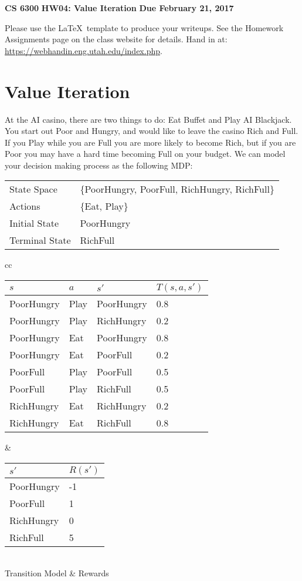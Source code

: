 \documentclass[12pt]{article}
\begin{document}
\begin{center}
{\bf CS 6300} \hfill {\large\bf HW04: Value Iteration} \hfill {\bf Due February 21, 2017}
\end{center}

\noindent
Please use the \LaTeX\ template to produce your writeups. See the
Homework Assignments page on the class website for details.  Hand in
at: \url{https://webhandin.eng.utah.edu/index.php}.

\section{Value Iteration}

At the AI casino, there are two things to do: Eat Buffet and Play AI
Blackjack.  You start out Poor and Hungry, and would like to leave the
casino Rich and Full.  If you Play while you are Full you are more
likely to become Rich, but if you are Poor you may have a hard time
becoming Full on your budget.  We can model your decision making
process as the following MDP:

\begin{flushleft}
\begin{tabular}{ll}
State Space & \{PoorHungry, PoorFull, RichHungry, RichFull\} \\
Actions     & \{Eat, Play\} \\
Initial State &  PoorHungry \\
Terminal State & RichFull 
\end{tabular}
\end{flushleft}

\begin{center}
\begin{tabular}{cc}
\begin{tabular}{|l|l|l|l|} \hline
$s$        & $a$  & $s'$       & $T(s,a,s')$ \\ \hline
PoorHungry & Play & PoorHungry & 0.8 \\ \hline
PoorHungry & Play & RichHungry & 0.2 \\ \hline
PoorHungry & Eat  & PoorHungry & 0.8 \\ \hline
PoorHungry & Eat  & PoorFull   & 0.2 \\ \hline
PoorFull   & Play & PoorFull   & 0.5 \\ \hline
PoorFull   & Play & RichFull   & 0.5 \\ \hline
RichHungry & Eat  & RichHungry & 0.2 \\ \hline
RichHungry & Eat  &RichFull    & 0.8 \\ \hline
\end{tabular} &
\begin{tabular}{|l|l|}\hline
$s'$       & $R(s')$ \\ \hline
PoorHungry & -1 \\  \hline
PoorFull   &  1 \\ \hline
RichHungry &  0 \\ \hline
RichFull   &  5 \\ \hline
\end{tabular} \\
Transition Model & Rewards
\end{tabular}
\end{center}
\end{document}
